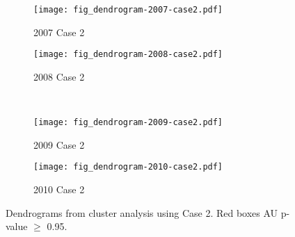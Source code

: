 \begin{figure}[!ht] \centering
	\captionsetup[subfigure]{width=2.0in} %
	\begin{subfigure}[t]{0.49\textwidth}
		\texttt{[image: fig\_dendrogram-2007-case2.pdf]}
		\caption[Case 2 cluster dendrograms.]{2007 Case 2}
		\label{fig: result-fig4.9a}
	\end{subfigure}
	\begin{subfigure}[t]{0.49\textwidth}
		\texttt{[image: fig\_dendrogram-2008-case2.pdf]}
		\caption[Case 2 cluster dendrograms.]{2008 Case 2}
		\label{fig: result-fig4.9b}
	\end{subfigure}\\
	\vspace{15pt}
	\begin{subfigure}[t]{0.49\textwidth}
		\texttt{[image: fig\_dendrogram-2009-case2.pdf]}
		\caption[Case 2 cluster dendrograms.]{2009 Case 2}
		\label{fig: result-fig4.9c}
	\end{subfigure}
	\begin{subfigure}[t]{0.49\textwidth}
		\texttt{[image: fig\_dendrogram-2010-case2.pdf]}
		\caption[Case 2 cluster dendrograms.]{2010 Case 2}
		\label{fig: result-fig4.9d}
	\end{subfigure}
	\vspace{5pt}
	\caption[Dendrograms from cluster analysis using Case 2.]{Dendrograms from cluster analysis using Case 2. Red boxes AU p-value $\geq$ 0.95.}
	\label{fig: result-fig4.9}
\end{figure}

